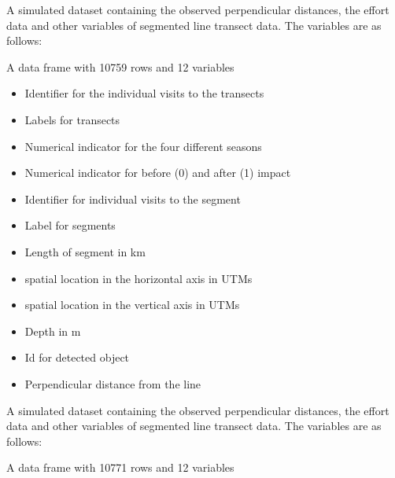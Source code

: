 \documentclass[a4paper]{book}
\begin{document}
%
\begin{Description}\relax
A simulated dataset containing the observed perpendicular distances, the effort data and other variables of 
segmented line transect data. The variables are as follows:
\end{Description}
%
\begin{Format}
A data frame with 10759 rows and 12 variables
\end{Format}
%
\begin{Details}\relax
\begin{itemize}

\item {} Identifier for the individual visits to the transects
\item {} Labels for transects
\item {} Numerical indicator for the four different seasons
\item {} Numerical indicator for before (0) and after (1) impact
\item {} Identifier for individual visits to the segment
\item {} Label for segments
\item {} Length of segment in km
\item {} spatial location in the horizontal axis in UTMs
\item {} spatial location in the vertical axis in UTMs
\item {} Depth in m
\item {} Id for detected object      
\item {} Perpendicular distance from the line

\end{itemize}

\end{Details}
%
\begin{Description}\relax
A simulated dataset containing the observed perpendicular distances, the effort data and other variables of 
segmented line transect data. The variables are as follows:
\end{Description}
%
\begin{Format}
A data frame with 10771 rows and 12 variables
\end{Format}
\end{document}
